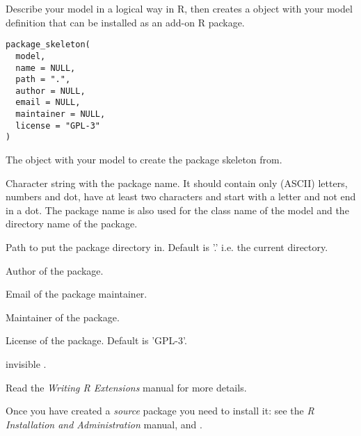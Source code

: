 \documentclass[letterpaper]{book}
\begin{document}
%
\begin{Description}
Describe your model in a logical way in R, then 
creates a  object with your model
definition that can be installed as an add-on R package.
\end{Description}
%
\begin{Usage}
\begin{verbatim}
package_skeleton(
  model,
  name = NULL,
  path = ".",
  author = NULL,
  email = NULL,
  maintainer = NULL,
  license = "GPL-3"
)
\end{verbatim}
\end{Usage}
%
\begin{Arguments}
\begin{ldescription}
\item[\code{model}] The  
object with your model to create the package skeleton from.

\item[\code{name}] Character string with the package name. It should
contain only (ASCII) letters, numbers and dot, have at least
two characters and start with a letter and not end in a dot.
The package name is also used for the class name of the model
and the directory name of the package.

\item[\code{path}] Path to put the package directory in. Default is '.'
i.e. the current directory.

\item[\code{author}] Author of the package.

\item[\code{email}] Email of the package maintainer.

\item[\code{maintainer}] Maintainer of the package.

\item[\code{license}] License of the package. Default is 'GPL-3'.
\end{ldescription}
\end{Arguments}
%
\begin{Value}
invisible .
\end{Value}
%
\begin{References}
Read the \emph{Writing R Extensions} manual for more
details.

Once you have created a \emph{source} package you need to install
it: see the \emph{R Installation and Administration} manual,
 and .
\end{References}
\end{document}
